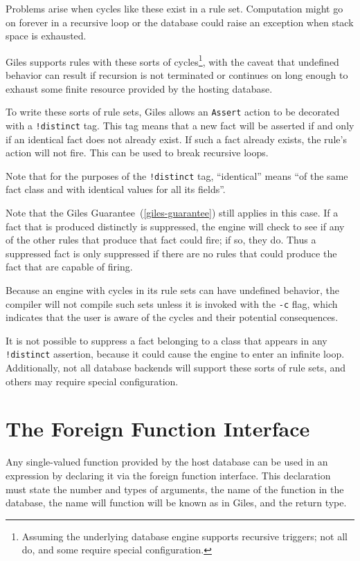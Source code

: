 \documentclass[letterpaper,10pt]{article}
\begin{document}
Problems arise when cycles like these exist in a rule set.
Computation might go on forever in a recursive loop or the database could raise an exception when stack space is exhausted.

Giles supports rules with these sorts of cycles\footnote{Assuming the underlying database engine supports recursive triggers; not all do, and some require special configuration.}, with the caveat that undefined behavior can result if recursion is not terminated or continues on long enough to exhaust some finite resource provided by the hosting database.

To write these sorts of rule sets, Giles allows an \texttt{Assert} action to be decorated with a \texttt{!distinct} tag.
This tag means that a new fact will be asserted if and only if an identical fact does not already exist.
If such a fact already exists, the rule's action will not fire.
This can be used to break recursive loops.

Note that for the purposes of the \texttt{!distinct} tag, ``identical'' means ``of the same fact class and with identical values for all its fields''.

Note that the Giles Guarantee~(\ref{giles-guarantee}) still applies in this case.
If a fact that is produced distinctly is suppressed, the engine will check to see if any of the other rules that produce that fact could fire; if so, they do.
Thus a suppressed fact is only suppressed if there are no rules that could produce the fact that are capable of firing.

Because an engine with cycles in its rule sets can have undefined behavior, the compiler will not compile such sets unless it is invoked with the \texttt{-c} flag, which indicates that the user is aware of the cycles and their potential consequences.

It is not possible to suppress a fact belonging to a class that appears in any \texttt{!distinct} assertion, because it could cause the engine to enter an infinite loop.
Additionally, not all database backends will support these sorts of rule sets, and others may require special configuration.

\section{The Foreign Function Interface}
Any single-valued function provided by the host database can be used in an expression by declaring it via the foreign function interface.
This declaration must state the number and types of arguments, the name of the function in the database, the name will function will be known as in Giles, and the return type.
\end{document}
